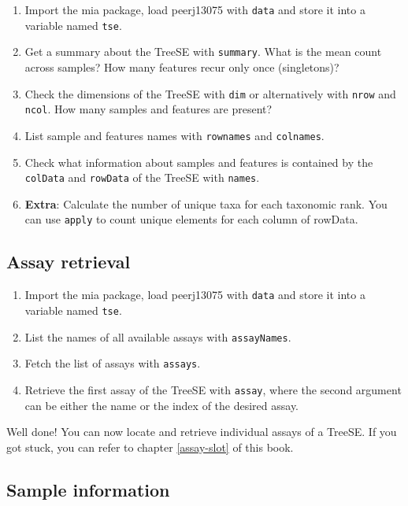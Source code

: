 \documentclass[
]{book}
\providecommand{\tightlist}{%
  \setlength{\itemsep}{0pt}\setlength{\parskip}{0pt}}
\begin{document}
\begin{enumerate}
\def\labelenumi{\arabic{enumi}.}
\tightlist
\item
  Import the mia package, load peerj13075 with \texttt{data} and store it into a
  variable named \texttt{tse}.
\item
  Get a summary about the TreeSE with \texttt{summary}. What is the mean count across
  samples? How many features recur only once (singletons)?
\item
  Check the dimensions of the TreeSE with \texttt{dim} or alternatively with \texttt{nrow}
  and \texttt{ncol}. How many samples and features are present?
\item
  List sample and features names with \texttt{rownames} and \texttt{colnames}.
\item
  Check what information about samples and features is contained by the
  \texttt{colData} and \texttt{rowData} of the TreeSE with \texttt{names}.
\item
  \textbf{Extra}: Calculate the number of unique taxa for each taxonomic rank. You
  can use \texttt{apply} to count unique elements for each column of rowData.
\end{enumerate}

\hypertarget{assay-retrieval}{%
\subsection{Assay retrieval}\label{assay-retrieval}}

\begin{enumerate}
\def\labelenumi{\arabic{enumi}.}
\tightlist
\item
  Import the mia package, load peerj13075 with \texttt{data} and store it into a
  variable named \texttt{tse}.
\item
  List the names of all available assays with \texttt{assayNames}.
\item
  Fetch the list of assays with \texttt{assays}.
\item
  Retrieve the first assay of the TreeSE with \texttt{assay}, where the second
  argument can be either the name or the index of the desired assay.
\end{enumerate}

Well done! You can now locate and retrieve individual assays of a TreeSE. If you
got stuck, you can refer to chapter \ref{assay-slot} of this book.

\hypertarget{sample-information}{%
\subsection{Sample information}\label{sample-information}}
\end{document}
